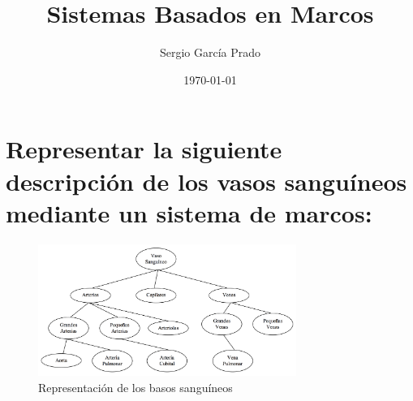 \documentclass[10pt, a4paper,spanish]{article}
\title{\vspace{-15mm}\fontsize{24pt}{10pt}\selectfont\textbf{Sistemas Basados en Marcos}} %
\author{Sergio García Prado}
\date{\today}
\begin{document}
	\maketitle %

	\thispagestyle{fancy} %


  \section{Representar la siguiente descripción de los vasos sanguíneos mediante un sistema de marcos:}

		\begin{figure}[htpb!]
			\begin{center}
				\includegraphics[width=0.75\textwidth]{diagram}
				\caption{Representación de los basos sanguíneos}
				\label{image:blood-vessel}
			\end{center}
		\end{figure}
\end{document}
